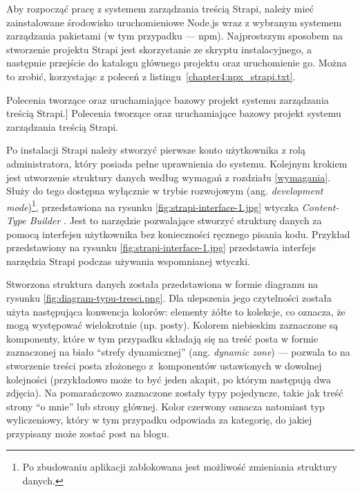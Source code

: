 \documentclass[a4paper, 12pt]{article}
\numberwithin{figure}{section}
\begin{document}
\begin{sloppypar}
Aby rozpocząć pracę z systemem zarządzania treścią Strapi, należy mieć zainstalowane środowisko uruchomieniowe Node.js wraz z wybranym systemem zarządzania pakietami (w tym przypadku --- npm). Najprostszym sposobem na stworzenie projektu Strapi jest skorzystanie ze skryptu instalacyjnego, a następnie przejście do katalogu głównego projektu oraz uruchomienie go. Można to zrobić, korzystając z poleceń z listingu~\ref{chapter4:npx_strapi.txt}.

\begin{code}[htbp]
    
    \caption
    [Polecenia tworzące oraz uruchamiające bazowy projekt systemu zarządzania treścią Strapi.]
    {Polecenia tworzące oraz uruchamiające bazowy projekt systemu zarządzania treścią Strapi.}
    \label{chapter4:npx_strapi.txt}
\end{code}

Po instalacji Strapi należy stworzyć pierwsze konto użytkownika z rolą administratora, który posiada pełne uprawnienia do systemu. Kolejnym krokiem jest utworzenie struktury danych według wymagań z rozdziału \ref{wymagania}. Służy do tego dostępna wyłącznie w trybie rozwojowym (ang. \textit{development mode})\footnote{Po zbudowaniu aplikacji zablokowana jest możliwość zmieniania struktury danych.}, przedstawiona na rysunku \ref{fig:strapi-interface-1.jpg} wtyczka \textit{Content-Type Builder} \cite{strapidocs}. Jest to narzędzie pozwalające stworzyć strukturę danych za pomocą interfejsu użytkownika bez konieczności ręcznego pisania kodu. Przykład przedstawiony na rysunku \ref{fig:strapi-interface-1.jpg} przedstawia interfejs narzędzia Strapi podczas używania wspomnianej wtyczki. 

Stworzona struktura danych została przedstawiona w formie diagramu na rysunku \ref{fig:diagram-typu-tresci.png}. Dla ulepszenia jego czytelności została użyta następująca konwencja kolorów: elementy żółte to kolekcje, co oznacza, że mogą występować wielokrotnie (np. posty). Kolorem niebieskim zaznaczone są komponenty, które w tym przypadku składają się na treść posta w formie zaznaczonej na biało ``strefy dynamicznej'' (ang. \textit{dynamic zone}) --- pozwala to na stworzenie treści posta złożonego z~komponentów ustawionych w dowolnej kolejności (przykładowo może to być jeden akapit, po którym następują dwa zdjęcia). Na pomarańczowo zaznaczone zostały typy pojedyncze, takie jak treść strony ``o mnie'' lub strony głównej. Kolor czerwony oznacza natomiast typ wyliczeniowy, który w tym przypadku odpowiada za kategorię, do jakiej przypisany może zostać post na blogu.


\end{sloppypar}
\end{document}
